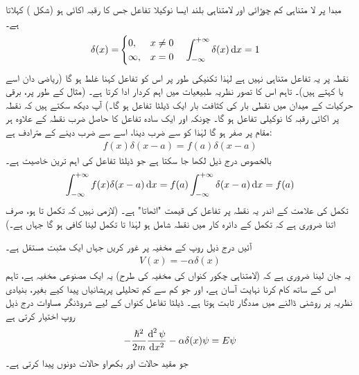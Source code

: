 مبدا پر  لا متناہی کم چوڑائی اور لامتناہی بلند ایسا نوکیلا تفاعل  جس کا رقبہ اکائی ہو  (شکل )  کہلاتا ہے۔ 
\begin{align}\label{مساوات_شروڈنگر_ڈیلٹا_تفاعل_تعریف}
\delta(x)=&
\begin{cases}
0,& x\neq 0\\
\infty, &  x=0
\end{cases}
&&
\int_{-\infty}^{+\infty}\delta(x)\dif{x}=1
\end{align} 
نقطہ    پر یہ تفاعل  متناہی نہیں ہے  لہٰذا تکنیکی طور پر اس کو تفاعل کہنا غلط ہو گا (ریاضی دان اسے  یا  کہتے ہیں)۔ تاہم اس کا تصور نظریہ طبیعیات  میں اہم کردار ادا کرتا ہے۔  (مثال کے طور پر، برقی حرکیات کے میدان میں نقطی بار کی کثافت بار ایک ڈیلٹا تفاعل ہو گا۔) آپ دیکھ سکتے ہیں کہ   نقطہ   پر اکائی رقبہ کا نوکیلی تفاعل ہو گا۔  چونکہ   اور ایک سادہ تفاعل  کا حاصل ضرب نقطہ     کے علاوہ ہر مقام پر صفر ہو گا لہٰذا  کو   سے ضرب دینا، اسے  سے ضرب دینے کے مترادف ہے:
\begin{align}
f(x)\delta(x-a)=f(a)\delta(x-a)
\end{align}
بالخصوص درج ذیل لکھا جا سکتا ہے جو  ڈیلٹا تفاعل کی اہم ترین خاصیت ہے۔ 
\begin{align}\label{مساوات_شروڈنگر_ڈیلٹا_تفاعل_اٹھاتا_ہے}
\int_{-\infty}^{+\infty}f(x)\delta(x-a)\dif{x}=f(a)\int_{-\infty}^{+\infty}\delta(x-a)\dif{x}=f(a)
\end{align}
 تکمل کی علامت کے اندر یہ نقطہ    پر تفاعل  کی قیمت "اٹھاتا" ہے۔ (لازمی نہیں کہ تکمل   تا    ہو،  صرف اتنا ضروری ہے کہ تکمل کے دائرہ کار میں نقطہ  شامل ہو لہٰذا  تا  تکمل لینا کافی ہو گا جہاں  ہے۔) 

آئیں درج ذیل روپ کے مخفیہ پر غور کریں جہاں   ایک مثبت مستقل ہے۔
\begin{align}
V(x)=-\alpha\delta(x)
\end{align}
یہ جان لینا ضروری ہے کہ (لامتناہی چکور کنواں کی مخفیہ کی طرح) یہ ایک مصنوعی مخفیہ ہے، تاہم اس کے ساتھ کام کرنا نہایت آسان  ہے، اور جو کم سے کم  تحلیلی پریشانیاں پیدا کیے بغیر،  بنیادی نظریہ پر روشنی ڈالنے میں مددگار ثابت ہوتا ہے۔  ڈیلٹا تفاعل کنواں کے لیے شروڈنگر مساوات درج ذیل روپ اختیار کرتی ہے
\begin{align}
-\frac{\hslash^{2}}{2m}\frac{\dif^{\,2}\psi}{\dif{x^{2}}}-\alpha\delta(x)\psi=E\psi
\end{align} 
جو مقید حالات   اور بکھراو حالات   دونوں پیدا کرتی ہے۔

